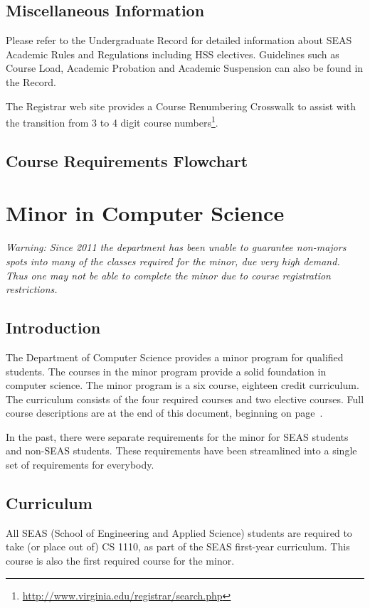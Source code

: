 \documentclass[10pt,letter]{book}
\newcommand{\mychapter}[2]{\chapter{#1}\renewcommand{\leftmark}{\textsc{#2}}}
\newcommand{\mysection}[1]{\section{#1}\renewcommand{\rightmark}{#1}}
\newcommand{\myurl}[1]{\footnote{\scriptsize\url{#1}}}
\begin{document}
\mysection{Miscellaneous Information}

Please refer to the Undergraduate Record for detailed information
about SEAS Academic Rules and Regulations including HSS
electives. Guidelines such as Course Load, Academic Probation and
Academic Suspension can also be found in the Record.

The Registrar web site provides a Course Renumbering Crosswalk to
assist with the transition from 3 to 4 digit course
numbers\myurl{http://www.virginia.edu/registrar/search.php}.



\clearpage
\mysection{Course Requirements Flowchart}

\begin{figure}[h!]
\end{figure}


\clearpage
\mychapter{Minor in Computer Science}{CS Minor}
\label{sec:csminor}

{\Large\em Warning: Since 2011 the department has been unable to
  guarantee non-majors spots into many of the classes required for the
  minor, due very high demand.  Thus one may not be able to complete
  the minor due to course registration restrictions.}

\mysection{Introduction}

The Department of Computer Science provides a minor program for
qualified students. The courses in the minor program provide a solid
foundation in computer science. The minor program is a six course,
eighteen credit curriculum. The curriculum consists of the four
required courses and two elective courses. Full course descriptions
are at the end of this document, beginning on
page~\pageref{sec:coursedesc}.

In the past, there were separate requirements for the minor for SEAS
students and non-SEAS students.  These requirements have been
streamlined into a single set of requirements for everybody.
 
\mysection{Curriculum}

All SEAS (School of Engineering and Applied Science) students are
required to take (or place out of) CS 1110, as part of the SEAS
first-year curriculum. This course is also the first required course
for the minor.
\end{document}
